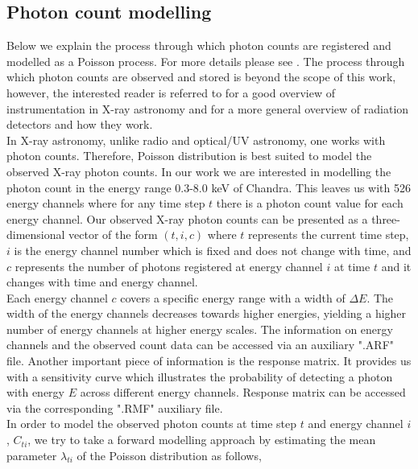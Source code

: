 \documentclass{aa}
\begin{document}
\subsection{Photon count modelling}
\label{sec:count_eq}
Below we explain the process through which photon counts are registered and modelled as a Poisson process. For more details please see \citet{BuchnerBoorman2024}. The process through which photon counts are observed and stored is beyond the scope of this work, however, the interested reader is referred to \citet{Arnaud2011} for a good overview of instrumentation in X-ray astronomy and \citet{Knoll2010} for a more general overview of radiation detectors and how they work. \\
In X-ray astronomy, unlike radio and optical/UV astronomy, one works with photon counts. Therefore, Poisson distribution is best suited to model the observed X-ray photon counts. In our work we are interested in modelling the photon count in the energy range 0.3-8.0 keV of Chandra. This leaves us with 526 energy channels where for any time step $t$ there is a photon count value for each energy channel. Our observed X-ray photon counts can be presented as a three-dimensional vector of the form $(t, i, c)$ where $t$ represents the current time step, $i$ is the energy channel number which is fixed and does not change with time, and $c$ represents the number of photons registered at energy channel $i$ at time $t$ and it changes with time and energy channel. \\
Each energy channel $c$ covers a specific energy range with a width of $\Delta E$. The width of the energy channels decreases towards higher energies, yielding a higher number of energy channels at higher energy scales. The information on energy channels and the observed count data can be accessed via an auxiliary ".ARF" file. Another important piece of information is the response matrix. It provides us with a sensitivity curve which illustrates the probability of detecting a photon with energy $E$ across different energy channels. Response matrix can be accessed via the corresponding ".RMF" auxiliary file. \\
In order to model the observed photon counts at time step $t$ and energy channel $i$, $C_{ti}$, we try to take a forward modelling approach by estimating the mean parameter $\lambda_{ti}$ of the Poisson distribution as follows,
\end{document}
